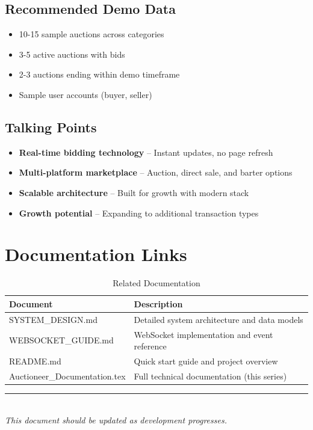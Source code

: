 \documentclass[12pt,a4paper]{article}
\begin{document}
\subsection{Recommended Demo Data}

\begin{itemize}
    \item 10-15 sample auctions across categories
    \item 3-5 active auctions with bids
    \item 2-3 auctions ending within demo timeframe
    \item Sample user accounts (buyer, seller)
\end{itemize}

\subsection{Talking Points}

\begin{infobox}
\begin{itemize}
    \item \textbf{Real-time bidding technology} -- Instant updates, no page refresh
    \item \textbf{Multi-platform marketplace} -- Auction, direct sale, and barter options
    \item \textbf{Scalable architecture} -- Built for growth with modern stack
    \item \textbf{Growth potential} -- Expanding to additional transaction types
\end{itemize}
\end{infobox}

\section{Documentation Links}

\begin{table}[H]
\centering
\begin{tabularx}{\textwidth}{|l|X|}
\hline
\textbf{Document} & \textbf{Description} \\
\hline
SYSTEM\_DESIGN.md & Detailed system architecture and data models \\
\hline
WEBSOCKET\_GUIDE.md & WebSocket implementation and event reference \\
\hline
README.md & Quick start guide and project overview \\
\hline
Auctioneer\_Documentation.tex & Full technical documentation (this series) \\
\hline
\end{tabularx}
\caption{Related Documentation}
\end{table}

\vfill

\begin{center}
\rule{0.5\textwidth}{0.4pt}\\[0.5cm]
\textit{This document should be updated as development progresses.}
\end{center}
\end{document}
